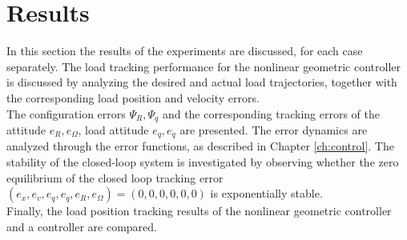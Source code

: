 \newpage
\section{Results}\label{sec:exp.results}
In this section the results of the experiments are discussed, for each case separately. 
The load tracking performance for the nonlinear geometric controller is discussed by analyzing the desired and actual load trajectories,   
together with the corresponding load position and velocity errors.\\
The configuration errors $ \Psi_R, \Psi_q $ and the corresponding tracking errors of the  attitude $ e_R, e_\Omega $, load attitude $ e_q, e_{\dot{q}} $ are presented.
The error dynamics are analyzed through the error functions, as described in Chapter \ref{ch:control}. 
The stability of the closed-loop system is investigated by observing whether 
the zero equilibrium of the closed loop tracking error $(e_x,e_v,e_q,e_{\dot{q}},e_R,e_\Omega)=(0,0,0,0,0,0) $ is exponentially stable.
\\%
Finally, the load position tracking results of the nonlinear geometric controller and a  controller are compared.
%
%
%

